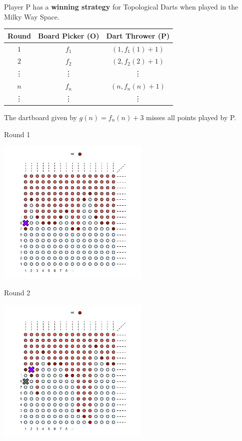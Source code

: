 \documentclass{beamer}
\begin{document}
\begin{frame}
  Player P has a \textbf{winning strategy} for Topological Darts when played in the Milky Way Space.
\begin{center}
\begin{tabular}{c|c|c}
Round & Board Picker (O) & Dart Thrower (P) \\\hline
$1$ & $f_1$ & $(1,f_1(1)+1)$ \\
$2$ & $f_2$ & $(2,f_2(2)+1)$ \\
\vdots & \vdots & \vdots \\
$n$ & $f_n$ & $(n,f_n(n)+1)$ \\
\vdots & \vdots & \vdots \\
\end{tabular}
\end{center}
  The dartboard given by $g(n)=f_n(n)+3$ misses all points played by P.
\end{frame}
\begin{frame}
Round 1
\begin{center}
    \includegraphics[height=7cm]{images/topdarts_fan_p1}
  \end{center}
\end{frame}
\begin{frame}
Round 2
\begin{center}
    \includegraphics[height=7cm]{images/topdarts_fan_p2}
  \end{center}
\end{frame}
\end{document}
